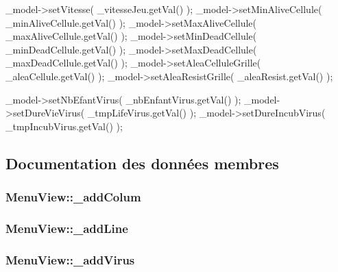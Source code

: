 \begin{DoxyCode}
{
        _model->setVitesse( _vitesseJeu.getVal() );
        _model->setMinAliveCellule( _minAliveCellule.getVal() );
        _model->setMaxAliveCellule( _maxAliveCellule.getVal() ); 
        _model->setMinDeadCellule( _minDeadCellule.getVal() ); 
        _model->setMaxDeadCellule( _maxDeadCellule.getVal() );
        _model->setAleaCelluleGrille( _aleaCellule.getVal() );
        _model->setAleaResistGrille( _aleaResist.getVal() );
        
        _model->setNbEfantVirus( _nbEnfantVirus.getVal() );
        _model->setDureVieVirus( _tmpLifeVirus.getVal() );
        _model->setDureIncubVirus( _tmpIncubVirus.getVal() );
}
\end{DoxyCode}


\subsection{Documentation des données membres}
\hypertarget{classMenuView_ab437e4727d8381964fa7a0d584ac17b8}{
\subsubsection[{\_\-addColum}]{ {\bf MenuView::\_\-addColum}}}
\label{classMenuView_ab437e4727d8381964fa7a0d584ac17b8}
\hypertarget{classMenuView_a77db02321d1e42439bd61528a14fd5b2}{
\subsubsection[{\_\-addLine}]{ {\bf MenuView::\_\-addLine}}}
\label{classMenuView_a77db02321d1e42439bd61528a14fd5b2}
\hypertarget{classMenuView_ab34b59aaa6955c9b2e5fae146be8221f}{
\subsubsection[{\_\-addVirus}]{ {\bf MenuView::\_\-addVirus}}}
